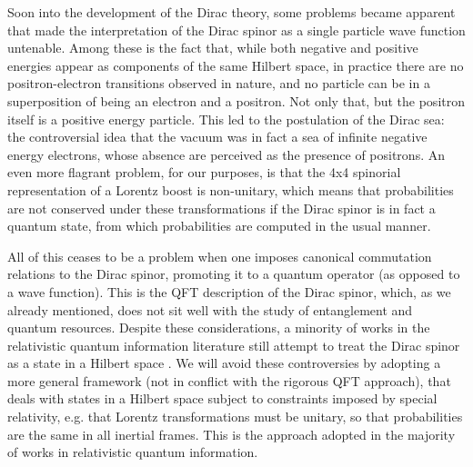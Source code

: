 \documentclass[12pt,a4paper,notitlepage]{report}
\begin{document}
Soon into the development of the Dirac theory, some problems became apparent that made the interpretation of the Dirac spinor as a single particle wave function untenable. 
Among these is the fact that, while both negative and positive energies appear as components of the same Hilbert space, in practice there are no positron-electron transitions observed in nature, and no particle can be in a superposition of being an electron and a positron. Not only that, but the positron itself is a positive energy particle. This led to the postulation of the Dirac sea: the controversial idea that the vacuum was in fact a sea of infinite negative energy electrons, whose absence are perceived as the presence of positrons. An even more flagrant problem, for our purposes, is that the 4x4 spinorial representation of a Lorentz boost is non-unitary, which means that probabilities are not conserved under these transformations if the Dirac spinor is in fact a quantum state, from which probabilities are computed in the usual manner.

All of this ceases to be a problem when one imposes canonical commutation relations to the Dirac spinor, promoting it to a quantum operator (as opposed to a wave function). This is the QFT description of the Dirac spinor, which, as we already mentioned, does not sit well with the study of entanglement and quantum resources. Despite these considerations, a minority of works in the relativistic quantum information literature still attempt to treat the Dirac spinor as a state in a Hilbert space \cite{alsing_milburn_2002, choi_2011, bittencourt_2018, alberto_1996, alberto_2011, bernardini_2014, bittencourt_2016}. We will avoid these controversies by adopting a more general framework (not in conflict with the rigorous QFT approach), that deals with states in a Hilbert space subject to constraints imposed by special relativity, e.g. that Lorentz transformations must be unitary, so that probabilities are the same in all inertial frames. This is the approach adopted in the majority of works in relativistic quantum information.
\end{document}
